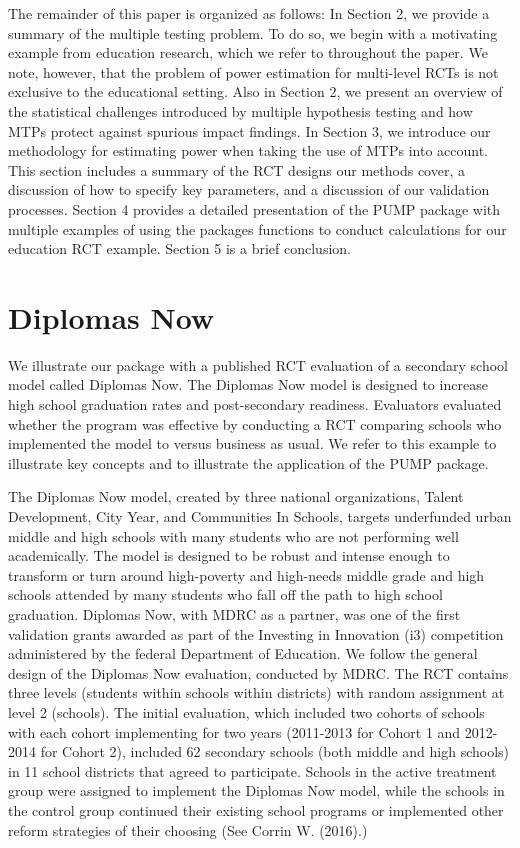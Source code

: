 \documentclass[
]{article}
\begin{document}
The remainder of this paper is organized as follows: In Section 2, we
provide a summary of the multiple testing problem. To do so, we begin
with a motivating example from education research, which we refer to
throughout the paper. We note, however, that the problem of power
estimation for multi-level RCTs is not exclusive to the educational
setting. Also in Section 2, we present an overview of the statistical
challenges introduced by multiple hypothesis testing and how MTPs
protect against spurious impact findings. In Section 3, we introduce our
methodology for estimating power when taking the use of MTPs into
account. This section includes a summary of the RCT designs our methods
cover, a discussion of how to specify key parameters, and a discussion
of our validation processes. Section 4 provides a detailed presentation
of the PUMP package with multiple examples of using the packages
functions to conduct calculations for our education RCT example. Section
5 is a brief conclusion.

\section{Diplomas Now}
\label{sec:diplomas}

We illustrate our package with a published RCT evaluation of a secondary
school model called Diplomas Now. The Diplomas Now model is designed to
increase high school graduation rates and post-secondary readiness.
Evaluators evaluated whether the program was effective by conducting a
RCT comparing schools who implemented the model to versus business as
usual. We refer to this example to illustrate key concepts and to
illustrate the application of the PUMP package.

The Diplomas Now model, created by three national organizations, Talent
Development, City Year, and Communities In Schools, targets underfunded
urban middle and high schools with many students who are not performing
well academically. The model is designed to be robust and intense enough
to transform or turn around high-poverty and high-needs middle grade and
high schools attended by many students who fall off the path to high
school graduation. Diplomas Now, with MDRC as a partner, was one of the
first validation grants awarded as part of the Investing in Innovation
(i3) competition administered by the federal Department of Education. We
follow the general design of the Diplomas Now evaluation, conducted by
MDRC. The RCT contains three levels (students within schools within
districts) with random assignment at level 2 (schools). The initial
evaluation, which included two cohorts of schools with each cohort
implementing for two years (2011-2013 for Cohort 1 and 2012-2014 for
Cohort 2), included 62 secondary schools (both middle and high schools)
in 11 school districts that agreed to participate. Schools in the active
treatment group were assigned to implement the Diplomas Now model, while
the schools in the control group continued their existing school
programs or implemented other reform strategies of their choosing (See
Corrin W. (2016).)
\end{document}
